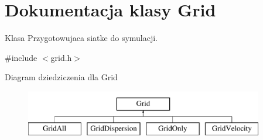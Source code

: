 \hypertarget{class_grid}{}\section{Dokumentacja klasy Grid}
\label{class_grid}


Klasa Przygotowujaca siatke do symulacji.  




{\ttfamily \#include $<$grid.\+h$>$}

Diagram dziedziczenia dla Grid\begin{figure}[H]
\begin{center}
\leavevmode
\includegraphics[height=2.000000cm]{class_grid}
\end{center}
\end{figure}
